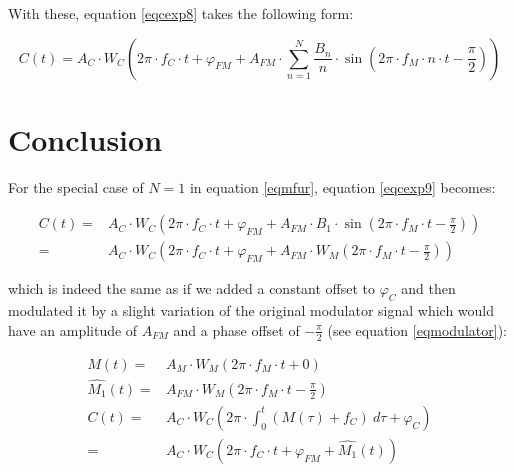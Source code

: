 \documentclass{article}
\begin{document}
    With these, equation \ref{eqcexp8} takes the following form:

    \begin{equation}\label{eqcexp9}
      C(t)
        = A_C \cdot W_C \left(
            2\pi \cdot f_C \cdot t
            + \varphi_{FM}
            + A_{FM} \cdot \sum_{n=1}^{N}
                \frac{B_n}{n}
                \cdot \sin \left(
                  2\pi \cdot f_M \cdot n \cdot t - \frac{\pi}{2}
                \right)
          \right)
    \end{equation}

  \section{Conclusion}

    For the special case of $N=1$ in equation \ref{eqmfur}, equation
    \ref{eqcexp9} becomes:

    \begin{equation}\label{eqcexp10}
      \begin{split}
        C(t)
          = & A_C \cdot W_C \left(
                2\pi \cdot f_C \cdot t
                + \varphi_{FM}
                + A_{FM} \cdot B_1 \cdot \sin \left(
                  2\pi \cdot f_M \cdot t - \frac{\pi}{2}
                \right)
              \right) \\
          = & A_C \cdot W_C \left(
                2\pi \cdot f_C \cdot t
                + \varphi_{FM}
                + A_{FM} \cdot W_M \left(
                  2\pi \cdot f_M \cdot t - \frac{\pi}{2}
                \right)
              \right)
      \end{split}
    \end{equation}

    which is indeed the same as if we added a constant offset to $\varphi_C$
    and then modulated it by a slight variation of the original modulator
    signal which would have an amplitude of $A_{FM}$ and a phase offset of
    $- \frac{\pi}{2}$ (see equation \ref{eqmodulator}):

    \begin{equation}
      \begin{split}
        M(t)
          = & A_M \cdot W_M (2\pi \cdot f_M \cdot t + 0) \\
        \hat{M_1}(t)
          = & A_{FM} \cdot W_M \left(
                2\pi \cdot f_M \cdot t - \frac{\pi}{2}
              \right) \\
        C(t)
          = & A_C \cdot W_C \left(
                2\pi \cdot \int_{0}^{t} \left( M(\tau) + f_C \right) \  d\tau
                + \varphi_C
              \right) \\
          = & A_C \cdot W_C \left(
                2\pi \cdot f_C \cdot t + \varphi_{FM} + \hat{M_1}(t)
              \right)
      \end{split}
    \end{equation}
\end{document}

